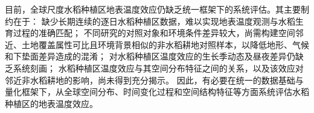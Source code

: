 目前，全球尺度水稻种植区地表温度效应仍缺乏统一框架下的系统评估。其主要制约在于：
缺少长期连续的逐日水稻种植区数据，难以实现地表温度观测与水稻生育过程的准确匹配；
不同研究的对照对象和环境条件差异较大，尚需构建空间邻近、土地覆盖属性可比且环境背景相似的非水稻耕地对照样本，以降低地形、气候和下垫面差异造成的混淆；
对水稻种植区温度效应的生长季动态及昼夜差异仍缺乏系统刻画；
水稻种植区温度效应与其空间分布特征之间的关系，以及该效应对邻近非水稻耕地的影响，尚未得到充分揭示。
因此，有必要在统一的数据基础与量化框架下，从全球空间分布、时间变化过程和空间结构特征等方面系统评估水稻种植区的地表温度效应。







